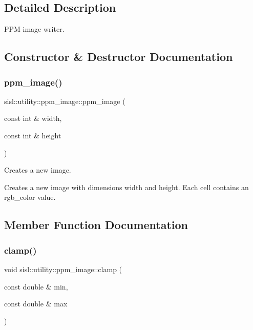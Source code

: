 \subsection{Detailed Description}
P\+PM image writer. 

\subsection{Constructor \& Destructor Documentation}
\mbox{\label{classsisl_1_1utility_1_1ppm__image_ab049aa633ce351727260eb9ca82b6a71}} 
\subsubsection{\texorpdfstring{ppm\+\_\+image()}{ppm\_image()}}
{\footnotesize\ttfamily sisl\+::utility\+::ppm\+\_\+image\+::ppm\+\_\+image (\begin{DoxyParamCaption}\item[{const int \&}]{width,  }\item[{const int \&}]{height }\end{DoxyParamCaption})\hspace{0.3cm}{\ttfamily [inline]}}



Creates a new image. 

Creates a new image with dimensions width and height. Each cell contains an rgb\+\_\+color value. 

\subsection{Member Function Documentation}
\mbox{\label{classsisl_1_1utility_1_1ppm__image_a2fd1c61391d4be4802be8e2af85d507c}} 
\subsubsection{\texorpdfstring{clamp()}{clamp()}}
{\footnotesize\ttfamily void sisl\+::utility\+::ppm\+\_\+image\+::clamp (\begin{DoxyParamCaption}\item[{const double \&}]{min,  }\item[{const double \&}]{max }\end{DoxyParamCaption})\hspace{0.3cm}{\ttfamily [inline]}}



